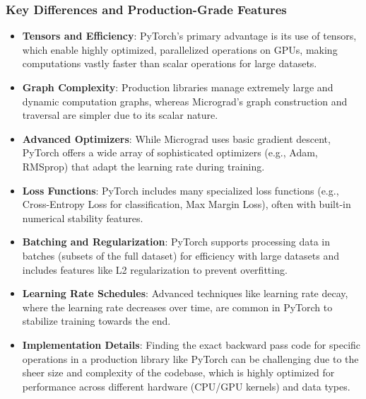 \subsubsection{Key Differences and Production-Grade Features} 
\begin{itemize} 
\item \textbf{Tensors and Efficiency}: PyTorch's primary advantage is its use of tensors, which enable highly optimized, parallelized operations on GPUs, making computations vastly faster than scalar operations for large datasets. 
\item \textbf{Graph Complexity}: Production libraries manage extremely large and dynamic computation graphs, whereas Micrograd's graph construction and traversal are simpler due to its scalar nature. 
\item \textbf{Advanced Optimizers}: While Micrograd uses basic gradient descent, PyTorch offers a wide array of sophisticated optimizers (e.g., Adam, RMSprop) that adapt the learning rate during training. 
\item \textbf{Loss Functions}: PyTorch includes many specialized loss functions (e.g., Cross-Entropy Loss for classification, Max Margin Loss), often with built-in numerical stability features. 
\item \textbf{Batching and Regularization}: PyTorch supports processing data in batches (subsets of the full dataset) for efficiency with large datasets and includes features like L2 regularization to prevent overfitting. 
\item \textbf{Learning Rate Schedules}: Advanced techniques like learning rate decay, where the learning rate decreases over time, are common in PyTorch to stabilize training towards the end. 
\item \textbf{Implementation Details}: Finding the exact backward pass code for specific operations in a production library like PyTorch can be challenging due to the sheer size and complexity of the codebase, which is highly optimized for performance across different hardware (CPU/GPU kernels) and data types. 
\end{itemize}

